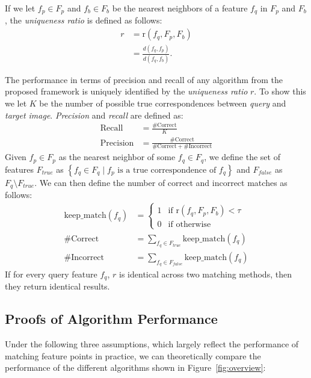 \documentclass[review]{elsarticle}
\newcommand{\twopartdef}[4]
{
	\left\{
		\begin{array}{ll}
			#1 & \mbox{if } #2 \\
			#3 & \mbox{if } #4
		\end{array}
	\right.
}
\begin{document}
If we let $f_p \in F_{p}$ and $f_b \in F_{b}$ be the nearest neighbors of a feature $f_q$ in $F_{p}$ and $F_{b}$, the \emph{uniqueness ratio} is defined as follows:
\begin{align*}
    r &= \text{r}(f_{q}, F_{p}, F_{b}) \\
        &= \frac{d(f_{q}, f_{p})}{d(f_{q}, f_{b})}.
\end{align*}

The performance in terms of precision and recall of any algorithm from the proposed framework is uniquely identified by the \emph{uniqueness ratio} $r$. To show this we let $K$ be the number of possible true correspondences between \emph{query} and \emph{target image}. \emph{Precision} and \emph{recall} are defined as:
\begin{align*}
    \textrm{Recall} &= \frac{\#\textrm{Correct}}{K} \\
    \textrm{Precision} &= \frac{\#\textrm{Correct}}{\#\textrm{Correct} + \#\textrm{Incorrect}}
\end{align*}
Given $f_{p} \in F_{p}$ as the nearest neighbor of some $f_q \in F_{q}$, we define the set of features $F_{true}$ as $\left\{ f_{q} \in F_{q} \mid f_{p} \text{ is a true correspondence of } f_{q} \right\}$ and $F_{false}$ as $F_{q} \setminus F_{true}$.  We can then define the number of correct and incorrect matches as follows:
\begin{align*}
    \textrm{keep\_match}(f_{q}) &= \twopartdef{ 1 }{\text{r}(f_{q}, 
    F_{p}, F_{b}) <
    \tau}{0}{\textrm{otherwise}} \\
    \#\textrm{Correct} &= \sum_{f_{q} \in F_{true}} 
    \textrm{keep\_match}(f_{q})\\
    \#\textrm{Incorrect} &= \sum_{f_{q} \in F_{false}}
    \textrm{keep\_match}(f_{q})
\end{align*}
If for every query feature $f_{q}$, $r$ is identical across two matching methods, then they return identical results. 

\subsection{Proofs of Algorithm Performance}
\label{S:Proofs}

Under the following three assumptions, which largely reflect the performance of matching feature points in practice, we can theoretically compare the performance of the different algorithms shown in Figure~\ref{fig:overview}:
\end{document}
